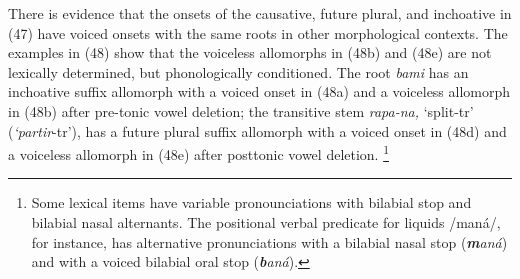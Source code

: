





There is evidence that the onsets of the causative, future plural, and inchoative in (47) have voiced onsets with the same roots in other morphological contexts. The examples in (48) show that the voiceless allomorphs in (48b) and (48e) are not lexically determined, but phonologically conditioned. The root \textit{bami} has an inchoative suffix allomorph with a voiced onset in (48a) and a voiceless allomorph in (48b) after pre-tonic vowel deletion; the transitive stem \textit{rapa-na,} ‘split-tr’ (\textit{‘partir}{}-tr’), has a future plural suffix allomorph with a voiced onset in (48d) and a voiceless allomorph in (48e) after posttonic vowel deletion.{} \footnote{Some lexical items have variable pronounciations with bilabial stop and bilabial nasal alternants. The positional verbal predicate for liquids /maná/, for instance, has alternative pronunciations with a bilabial nasal stop (\textbf{\textit{m}}\textit{aná}) and with a voiced bilabial oral stop (\textbf{\textit{b}}\textit{aná}).}










